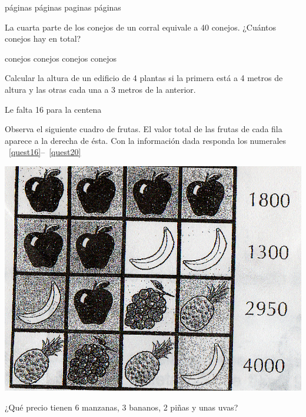 \documentclass[10pt,letterpaper,addpoints]{exam}
\begin{document}
\begin{questions}
\begin{oneparchoices}
 páginas
 páginas
 paginas
 páginas
\end{oneparchoices}
\question
La cuarta parte de los conejos de un corral equivale a 40 conejos. ¿Cuántos conejos hay en total?
\begin{oneparchoices}
 conejos
 conejos
 conejos
 conejos
\end{oneparchoices}
\question
Calcular la altura de un edificio de 4 plantas si la primera está a 4 metros de altura y las otras cada una a 3 metros de la anterior.

\begin{oneparchoices}
\end{oneparchoices}
\question
Le falta 16 para la centena

\begin{oneparchoices}
\end{oneparchoices}

\begin{minipage}{0.6\textwidth}{Observa el siguiente cuadro de frutas. El valor total de las frutas de cada fila aparece a la derecha de ésta. Con la información dada responda los numerales ~\ref{quest16}--~\ref{quest20}}
\end{minipage}\hfill
\begin{minipage}{0.4\textwidth}{\includegraphics[scale=.2]{Images/frutas.png}}
\end{minipage}
\question \label{quest16}
¿Qu\'e precio tienen 6 manzanas, 3 bananos, 2 piñas y unas uvas?


\end{questions}
\end{document}
